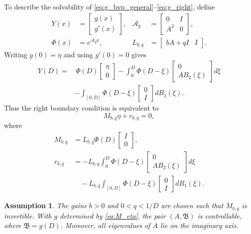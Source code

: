 \documentclass[journal]{IEEEtran}
\newtheorem{assumption}{Assumption}
\newcommand{\Bcal}{\mathfrak B}
\begin{document}
To describe the solvability of \eqref{eq:g_bvp_general}--\eqref{eq:g_right}, define
\begin{align}
 Y(x)&=\begin{bmatrix}g(x)\\ g'(x)\end{bmatrix},
 &
 \mathcal A_g&=\begin{bmatrix}0&I\\ A^2&0\end{bmatrix},\label{eq:Y_Ag}\\
 \Phi(x)&=e^{\mathcal A_gx},
 &
 L_{b,q}&=\begin{bmatrix}bA+qI&I\end{bmatrix}.
\end{align}
Writing $g(0)=\eta$ and using $g'(0)=0$ gives
\begin{align}
Y(D)=&\,\Phi(D)\begin{bmatrix}\eta\\0\end{bmatrix}
-\int_0^D\Phi(D-\xi)\begin{bmatrix}0\\ AB_2(\xi)\end{bmatrix}d\xi\nonumber\\
&-\int_{[0,D]}\Phi(D-\xi)\begin{bmatrix}0\\ I\end{bmatrix}dB_1(\xi).
\end{align}
Thus the right boundary condition is equivalent to
\begin{equation}
 M_{b,q}\eta+r_{b,q}=0,\label{eq:M_eta}
\end{equation}
where
\begin{align}
 M_{b,q}&=L_{b,q}\Phi(D)\begin{bmatrix}I\\0\end{bmatrix},\label{eq:M_bq}\\
 r_{b,q}&=-L_{b,q}\int_0^D\Phi(D-\xi)\begin{bmatrix}0\\ AB_2(\xi)\end{bmatrix}d\xi\nonumber\\
&\quad -L_{b,q}\int_{[0,D]}\Phi(D-\xi)\begin{bmatrix}0\\ I\end{bmatrix}dB_1(\xi).\label{eq:r_bq}
\end{align}

\begin{assumption}\label{ass:general}
The gains $b>0$ and $0<q<1/D$ are chosen such that $M_{b,q}$ is invertible. With $g$ determined by \eqref{eq:M_eta}, the pair $(A,\Bcal)$ is controllable, where $\Bcal=g(D)$. Moreover, all eigenvalues of $A$ lie on the imaginary axis.
\end{assumption}
\end{document}
